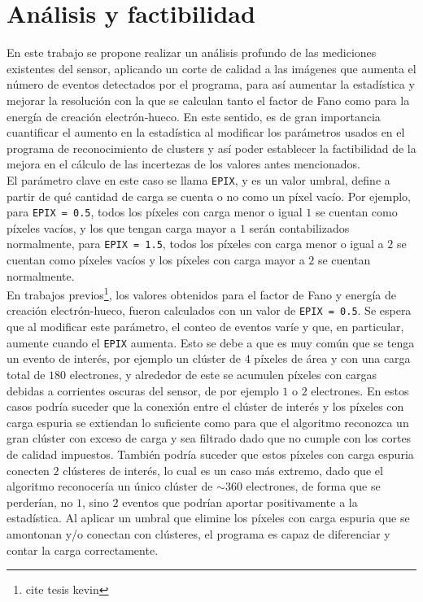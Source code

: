 \section{Análisis y factibilidad}
\noindent En este trabajo se propone realizar un análisis profundo de las mediciones existentes del sensor, aplicando un corte de calidad a las imágenes que aumenta el número de eventos detectados por el programa, para así aumentar la estadística y mejorar la resolución con la que se calculan tanto el factor de Fano como para la energía de creación electrón-hueco. %
En este sentido, es de gran importancia cuantificar el aumento en la estadística al modificar los parámetros usados en el programa de reconocimiento de clusters y así poder establecer la factibilidad de la mejora en el cálculo de las incertezas de los valores antes mencionados.\\
\indent El parámetro clave en este caso se llama \verb|EPIX|, y es un valor umbral, define a partir de qué cantidad de carga se cuenta o no como un píxel vacío. Por ejemplo, para \verb|EPIX = 0.5|, todos los píxeles con carga menor o igual $1$ se cuentan como píxeles vacíos, y los que tengan carga mayor a $1$ serán contabilizados normalmente, para \verb|EPIX = 1.5|, todos los píxeles con carga menor o igual a $2$ se cuentan como píxeles vacíos y los píxeles con carga mayor a $2$ se cuentan normalmente.\\
\indent En trabajos previos\footnote{cite tesis kevin}, los valores obtenidos para el factor de Fano y energía de creación electrón-hueco, fueron calculados con un valor de \verb|EPIX = 0.5|. Se espera que al modificar este parámetro, el conteo de eventos varíe y que, en particular, aumente cuando el \verb|EPIX| aumenta. Esto se debe a que es muy común que se tenga un evento de interés, por ejemplo un clúster de $4$ píxeles de área y con una carga total de $180$ electrones, y alrededor de este se acumulen píxeles con cargas debidas a corrientes oscuras del sensor, de por ejemplo $1$ o $2$ electrones. En estos casos podría suceder que la conexión entre el clúster de interés y los píxeles con carga espuria se extiendan lo suficiente como para que el algoritmo reconozca un gran clúster con exceso de carga y sea filtrado dado que no cumple con los cortes de calidad impuestos. También podría suceder que estos píxeles con carga espuria conecten $2$ clústeres de interés, lo cual es un caso más extremo, dado que el algoritmo reconocería un único clúster de $\sim 360$ electrones, de forma que se perderían, no $1$, sino $2$ eventos que podrían aportar positivamente a la estadística. Al aplicar un umbral que elimine los píxeles con carga espuria que se amontonan y/o conectan con clústeres, el programa es capaz de diferenciar y contar la carga correctamente.\\
